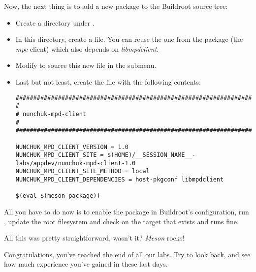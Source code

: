 Now, the next thing is to add a new package to the Buildroot source
tree:
\begin{itemize}
\item Create a  directory under .
\item In this directory, create a  file. You can reuse
      the one from the  package (the {\em mpc} client)
      which also depends on {\em libmpdclient}.
\item Modify  to source this new file in the
       submenu.
\item Last but not least, create the  file
      with the following contents:
\begin{verbatim}
################################################################################
#
# nunchuk-mpd-client
#
################################################################################

NUNCHUK_MPD_CLIENT_VERSION = 1.0
NUNCHUK_MPD_CLIENT_SITE = $(HOME)/__SESSION_NAME__-labs/appdev/nunchuk-mpd-client-1.0
NUNCHUK_MPD_CLIENT_SITE_METHOD = local
NUNCHUK_MPD_CLIENT_DEPENDENCIES = host-pkgconf libmpdclient

$(eval $(meson-package))
\end{verbatim}
\end{itemize}

All you have to do now is to enable the 
package in Buildroot's configuration, run , update the root
filesystem and check on the target that
 exists and runs fine.

All this was pretty straightforward, wasn't it? {\em Meson} rocks!

Congratulations, you've reached the end of all our labs. Try to look
back, and see how much experience you've gained in these last days.
